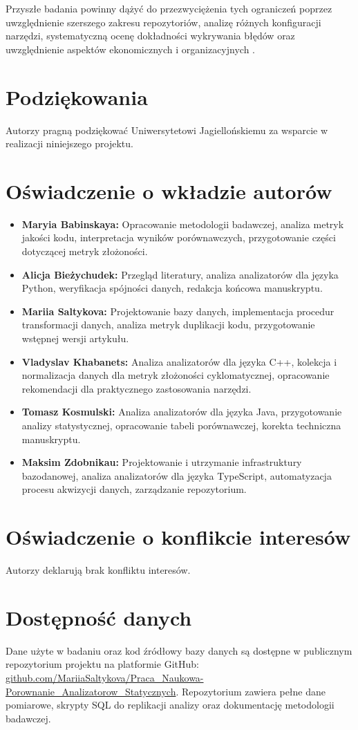 \documentclass[a4paper,12pt]{article}
\begin{document}
Przyszłe badania powinny dążyć do przezwyciężenia tych ograniczeń poprzez uwzględnienie szerszego zakresu repozytoriów, analizę różnych konfiguracji narzędzi, systematyczną ocenę dokładności wykrywania błędów oraz uwzględnienie aspektów ekonomicznych i organizacyjnych \cite{muske2018survey}.

\section*{Podziękowania}
Autorzy pragną podziękować Uniwersytetowi Jagiellońskiemu za wsparcie w realizacji niniejszego projektu.

\section*{Oświadczenie o wkładzie autorów}
\begin{itemize}
\item \textbf{Maryia Babinskaya:} Opracowanie metodologii badawczej, analiza metryk jakości kodu, interpretacja wyników porównawczych, przygotowanie części dotyczącej metryk złożoności.
\item \textbf{Alicja Bieżychudek:} Przegląd literatury, analiza analizatorów dla języka Python, weryfikacja spójności danych, redakcja końcowa manuskryptu.
\item \textbf{Mariia Saltykova:} Projektowanie bazy danych, implementacja procedur transformacji danych, analiza metryk duplikacji kodu, przygotowanie wstępnej wersji artykułu.
\item \textbf{Vladyslav Khabanets:} Analiza analizatorów dla języka C++, kolekcja i normalizacja danych dla metryk złożoności cyklomatycznej, opracowanie rekomendacji dla praktycznego zastosowania narzędzi.
\item \textbf{Tomasz Kosmulski:} Analiza analizatorów dla języka Java, przygotowanie analizy statystycznej, opracowanie tabeli porównawczej, korekta techniczna manuskryptu.
\item \textbf{Maksim Zdobnikau:} Projektowanie i utrzymanie infrastruktury bazodanowej, analiza analizatorów dla języka TypeScript, automatyzacja procesu akwizycji danych, zarządzanie repozytorium.
\end{itemize}

\section*{Oświadczenie o konflikcie interesów}
Autorzy deklarują brak konfliktu interesów.

\section*{Dostępność danych}
Dane użyte w badaniu oraz kod źródłowy bazy danych są dostępne w publicznym repozytorium projektu na platformie GitHub: \href{https://github.com/MariiaSaltykova/Praca_Naukowa-Porownanie_Analizatorow_Statycznych}{github.com/MariiaSaltykova/Praca\_Naukowa-Porownanie\_Analizatorow\_Statycznych}. Repozytorium zawiera pełne dane pomiarowe, skrypty SQL do replikacji analizy oraz dokumentację metodologii badawczej.




\end{document}

